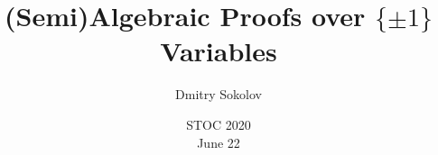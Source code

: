 

\titlegraphic{
    
}


\title[$\{\pm 1\}$ Variables]{
    (Semi)Algebraic Proofs over $\{\pm 1\}$ Variables
}

\author[Sokolov D.]{
    Dmitry Sokolov
}  


\date{STOC 2020\\ June 22}

\newcommand{\SPCR}{\PrSys{S}\text{-}\PrSys{PCR}}
\newcommand{\SSOS}{\PrSys{S}\text{-}\PrSys{SOS}}




    \maketitle

    
    
    
    

